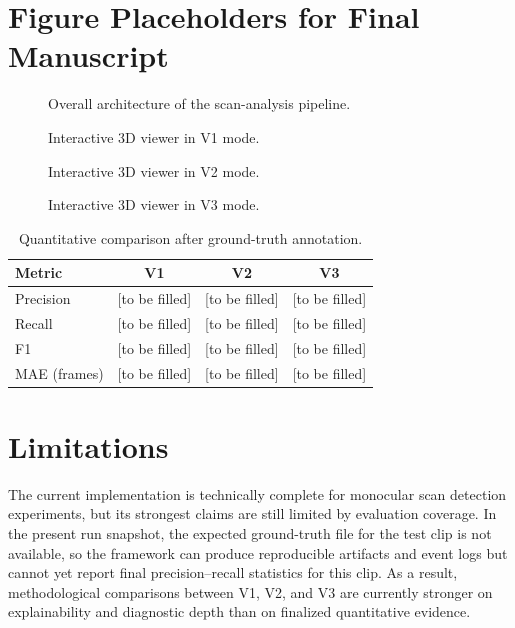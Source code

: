 \documentclass[11pt,a4paper]{article}
\begin{document}
\section{Figure Placeholders for Final Manuscript}
\begin{figure}[H]
\centering
{}
\caption{Overall architecture of the scan-analysis pipeline.}
\label{fig:architecture}
\end{figure}

\begin{figure}[H]
\centering
{}
\caption{Interactive 3D viewer in V1 mode.}
\label{fig:v1_viewer}
\end{figure}

\begin{figure}[H]
\centering
{}
\caption{Interactive 3D viewer in V2 mode.}
\label{fig:v2_viewer}
\end{figure}

\begin{figure}[H]
\centering
{}
\caption{Interactive 3D viewer in V3 mode.}
\label{fig:v3_viewer}
\end{figure}

\begin{table}[H]
\centering
\begin{tabular}{lccc}
\toprule
Metric & V1 & V2 & V3 \\
\midrule
Precision & [to be filled] & [to be filled] & [to be filled] \\
Recall & [to be filled] & [to be filled] & [to be filled] \\
F1 & [to be filled] & [to be filled] & [to be filled] \\
MAE (frames) & [to be filled] & [to be filled] & [to be filled] \\
\bottomrule
\end{tabular}
\caption{Quantitative comparison after ground-truth annotation.}
\label{tab:quant_results}
\end{table}

\section{Limitations}
The current implementation is technically complete for monocular scan detection experiments, but its strongest claims are still limited by evaluation coverage. In the present run snapshot, the expected ground-truth file for the test clip is not available, so the framework can produce reproducible artifacts and event logs but cannot yet report final precision--recall statistics for this clip. As a result, methodological comparisons between V1, V2, and V3 are currently stronger on explainability and diagnostic depth than on finalized quantitative evidence.
\end{document}
